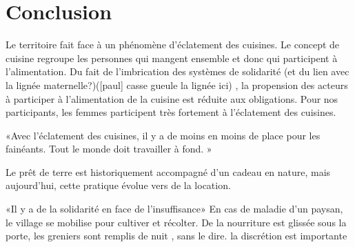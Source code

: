 \chapter{Conclusion}

Le territoire fait face à un phénomène d’éclatement des cuisines. Le concept de cuisine regroupe les personnes qui mangent ensemble et donc qui participent à l’alimentation. Du fait de l’imbrication des systèmes de solidarité (et du lien avec la lignée maternelle?)([paul] casse gueule la lignée ici) , la propension des acteurs à participer à l’alimentation de la cuisine est réduite aux obligations. Pour nos participants, les femmes participent très fortement à l’éclatement des cuisines.

«Avec l’éclatement des cuisines, il y a de moins en moins de place pour les fainéants. Tout le monde doit travailler à fond. »


Le prêt de terre est historiquement accompagné d’un cadeau en nature, mais aujourd’hui, cette pratique évolue vers de la location.

«Il y a de la solidarité en face de l’insuffisance»
En cas de maladie d’un paysan, le village se mobilise pour cultiver et récolter.
De la nourriture est glissée sous la porte, les greniers sont remplis de nuit , sans le dire.
la discrétion est importante
